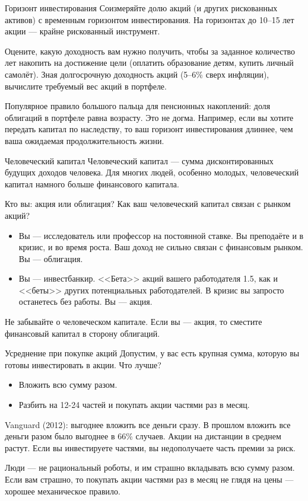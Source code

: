 \documentclass{beamer}
\begin{document}
\begin{frame}{Горизонт инвестирования}
\justify
Соизмеряйте долю акций (и других рискованных активов) с временным горизонтом 
инвестирования. На горизонтах до 10--15 лет акции --- крайне рискованный 
инструмент.

\justify
Оцените, какую доходность вам нужно получить, чтобы за заданное количество лет
накопить на достижение цели (оплатить образование детям, купить личный 
самолёт). Зная долгосрочную доходность акций (5--6\% сверх инфляции), вычислите 
требуемый вес акций в портфеле.

\justify
Популярное правило большого пальца для пенсионных накоплений: доля облигаций в 
портфеле равна возрасту. Это не догма. Например, если вы хотите передать
капитал по наследству, то ваш горизонт инвестирования длиннее, чем ваша 
ожидаемая продолжительность жизни.
\end{frame}



\begin{frame}{Человеческий капитал}
\justify
Человеческий капитал --- сумма дисконтированных будущих доходов человека. Для 
многих людей, особенно молодых, человеческий капитал намного больше финансового 
капитала.

\justify
Кто вы: акция или облигация? Как ваш человеческий капитал связан с рынком 
акций?
\begin{itemize}
\justifying
\item Вы --- исследователь или профессор на постоянной ставке. Вы преподаёте и 
в кризис, и во время роста. Ваш доход не сильно связан с финансовым рынком. Вы 
--- облигация.
\item Вы --- инвестбанкир. <<Бета>> акций вашего работодателя 1.5, как и 
<<беты>> других потенциальных работодателей. В кризис вы запросто останетесь 
без работы. Вы --- акция.
\end{itemize}

\justify
Не забывайте о человеческом капитале. Если вы --- акция, то сместите финансовый 
капитал в сторону облигаций.
\end{frame}



\begin{frame}{Усреднение при покупке акций}
\justify
Допустим, у вас есть крупная сумма, которую вы готовы инвестировать в акции.
Что лучше?
\begin{itemize}
\justifying
\item Вложить всю сумму разом.
\item Разбить на 12-24 частей и покупать акции частями раз в месяц.
\end{itemize}

\justify
Vanguard (2012): выгоднее вложить все деньги сразу. В прошлом вложить все 
деньги разом было выгоднее в 66\% случаев. Акции на дистанции в среднем растут.
Если вы инвестируете частями, вы недополучаете часть премии за риск.

\justify
Люди --- не рациональный роботы, и им страшно вкладывать всю сумму разом. Если
вам страшно, то покупать акции частями раз в месяц не глядя на цены --- хорошее
механическое правило.
\end{frame}
\end{document}
